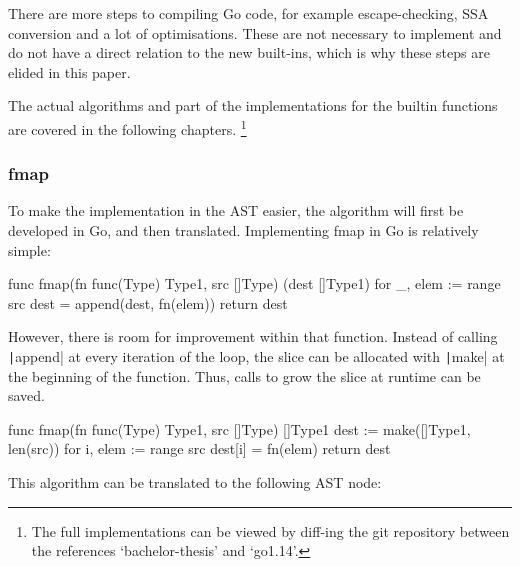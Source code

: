 There are more steps to compiling Go code, for example escape-checking,
SSA conversion and a lot of optimisations. These are not necessary to
implement and do not have a direct relation to the new built-ins, which
is why these steps are elided in this paper.

The actual algorithms and part of the implementations for the builtin
functions are covered in the following chapters.
\footnote{
    The full implementations can be viewed by diff-ing the git repository
    between the references `bachelor-thesis' and `go1.14'\autocite{ba-go1-14-thesis-diff}.
}

\subsubsection{fmap}

To make the implementation in the AST easier, the algorithm will first be
developed in Go, and then translated. Implementing fmap in Go is relatively
simple:

\begin{code}
    \label{code:fmap-go}
    \begin{gocode}
func fmap(fn func(Type) Type1, src []Type) (dest []Type1) {
    for _, elem := range src {
        dest = append(dest, fn(elem))
    }
    return dest
}
\end{gocode}
\end{code}
However, there is room for improvement within that function. Instead
of calling \texttt|append| at every iteration of the loop, the slice can
be allocated with \texttt|make| at the beginning of the function. Thus,
calls to grow the slice at runtime can be saved.

\begin{code}
    \label{code:fmap-go-improved}
    \begin{gocode}
func fmap(fn func(Type) Type1, src []Type) []Type1 {
    dest := make([]Type1, len(src))
    for i, elem := range src {
        dest[i] = fn(elem)
    }
    return dest
}
    \end{gocode}
\end{code}
This algorithm can be translated to the following AST node:

\begin{code}
\end{code}
